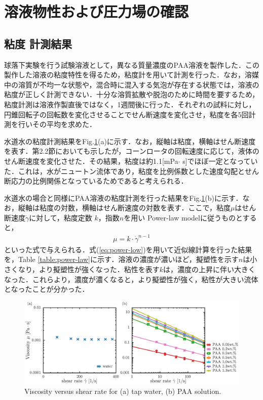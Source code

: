 \section{溶液物性および圧力場の確認}
\subsection{粘度 計測結果}
球落下実験を行う試験溶液として，異なる質量濃度のPAA溶液を製作した．この製作した溶液の粘度特性を得るため，粘度計を用いて計測を行った．なお，溶媒中の溶質が不均一な状態や，混合時に混入する気泡が存在する状態では，溶液の粘度が正しく計測できない．十分な溶質拡散や脱泡のために時間を要するため，粘度計測は溶液作製直後ではなく，1週間後に行った．それぞれの試料に対し，円錐回転子の回転数を変化させることでせん断速度を変化させ，粘度を各5回計測を行いその平均を求めた．

水道水の粘度計測結果をFig.\ref{fig:vis}(a)に示す．なお，縦軸は粘度，横軸はせん断速度を表す．第2.2節においても示したが，コーンロータの回転速度に応じて，液体のせん断速度を変化させた．その結果，粘度は約1.1[mPa$\cdot$ s]でほぼ一定となっていた．これは，水がニュートン流体であり，粘度を比例係数とした速度勾配とせん断応力の比例関係となっているためであると考えられる．

水道水の場合と同様にPAA溶液の粘度計測を行った結果をFig.\ref{fig:vis}(b)に示す．なお，縦軸は粘度の対数，横軸はせん断速度の対数を表す．ここで，粘度$\mu$はせん断速度$\dot{\gamma}$に対して，粘度定数 $k$，指数$n$を用い Power-law modelに従うものとすると，
\begin{eqnarray}
	\label{eq:power-low}
	\mu=k\cdot\dot{\gamma}^{n-1}
\end{eqnarray}
といった式で与えられる\cite{ref:1}．式(\ref{eq:power-low})を用いて近似線計算を行った結果を，Table \ref{table:power-law}に示す．溶液の濃度が濃いほど，擬塑性を示す$n$は小さくなり，より擬塑性が強くなった．粘性を表す$k$は，濃度の上昇に伴い大きくなった．これらより，濃度が濃くなると，より擬塑性が強く，粘性が大きい流体となったことが分かった．

\begin{figure}[ht]
	\centering
	\includegraphics[width=15cm,clip]{3-Physical_Property/viscosity.eps}
	\caption{Viscosity versus shear rate for (a) tap water, (b) PAA solution.}
	\label{fig:vis}
\end{figure}

